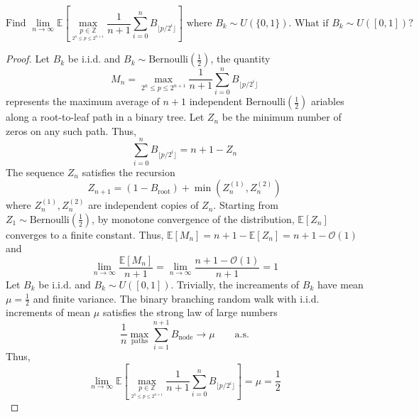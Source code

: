 \documentclass[14pt]{extarticle}
\newcommand{\B}[1]{\mathbb{#1}}
\newcommand{\C}[1]{\mathcal{#1}}
\newcommand{\Floor}[1]{\lfloor{#1}\rfloor}
\newcommand{\E}{\mathbb{E}}
\newcommand{\LINE}[1]{\noindent\makebox[\linewidth]{\rule{8in}{#1pt}}}
\theoremstyle{definition}
\numberwithin{equation}{section}
\begin{document}
\[\text{Find }\lim_{n\to\infty}\E\left[\max_{\underset{2^n\le p\le2^{n+1}}{p\in\B{Z}}}\frac{1}{n+1}\sum_{i=0}^{n}B_{\Floor{p/2^i}}\right]\text{ where }B_k\sim U(\{0,1\})\text{. What if }B_k\sim U([0,1])?\]
\LINE{0.3}
\begin{proof}
Let $B_k$ be i.i.d. and $B_k\sim \text{Bernoulli}\left(\frac{1}{2}\right)$, the quantity
\[M_n=\max_{2^n\le{p}\le2^{n+1}}\frac{1}{n+1}\sum_{i=0}^{n}B_{\Floor{p/2^i}}\]
represents the maximum average of $n+1$ independent Bernoulli$\left(\frac{1}{2}\right)$ ariables along a root-to-leaf path in a binary tree.
Let $Z_n$ be the minimum number of zeros on any such path.
Thus, \[\sum_{i=0}^{n}B_{\Floor{p/2^i}}=n+1-Z_n\]
The sequence $Z_n$ satisfies the recursion
\[Z_{n+1}=(1-B_{\text{root}})+\min\left(Z_n^{(1)},Z_n^{(2)}\right)\]
where $Z_n^{(1)},Z_n^{(2)}$ are independent copies of $Z_n$.
Starting from $Z_1\sim\text{Bernoulli}\left(\frac{1}{2}\right)$, by monotone convergence of the distribution, $\E[Z_n]$ converges to a finite constant.
Thus, $\E[M_n]=n+1-\E[Z_n]=n+1-\C{O}(1)$ and
\[\lim_{n\to\infty}\frac{\E[M_n]}{n+1}=\lim_{n\to\infty}\frac{n+1-\C{O}(1)}{n+1}=1\]
Let $B_k$ be i.i.d. and $B_k\sim U([0,1])$.
Trivially, the increaments of $B_k$ have mean $\mu=\frac{1}{2}$ and finite variance.
The binary branching random walk with i.i.d. increments of mean $\mu$ satisfies the strong law of large numbers
\[\frac{1}{n}\max_{\text{paths}}\sum_{i=1}^{n+1}B_{\text{node}}\to\mu\qquad\text{a.s.}\]
Thus, \[\lim_{n\to\infty}\E\left[\max_{\underset{2^n\le p\le2^{n+1}}{p\in\B{Z}}}\frac{1}{n+1}\sum_{i=0}^{n}B_{\Floor{p/2^i}}\right]=\mu=\frac{1}{2}\]
\end{proof}
\end{document}
